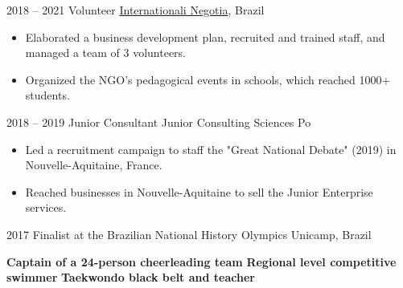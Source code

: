 \documentclass[9pt]{developercv} %
\begin{document}
\begin{entrylist}
\entry
		{2018 -- 2021}
		{Volunteer}
		{\href{https://www.internationali.org/sobre}{Internationali Negotia}, Brazil}
		{\vspace{-10pt}
        \begin{itemize}[noitemsep,topsep=0pt,parsep=0pt,partopsep=0pt, leftmargin=-1pt]
           \item Elaborated a business development plan, recruited and trained staff, and managed a team of 3 volunteers. 
           \item Organized the NGO's pedagogical events in schools, which reached 1000+ students.
        \end{itemize} 
        }
\entry
		{2018 -- 2019}
		{Junior Consultant}
		{Junior Consulting Sciences Po}
		{\vspace{-10pt}
        \begin{itemize}[noitemsep,topsep=0pt,parsep=0pt,partopsep=0pt, leftmargin=-1pt]
            \item Led a recruitment campaign to staff the "Great National Debate" (2019) in Nouvelle-Aquitaine, France. 
            \item Reached businesses in Nouvelle-Aquitaine to sell the Junior Enterprise services. 
        \end{itemize} 
        }
\entry
		{2017}
		{Finalist at the Brazilian National History Olympics}
		{Unicamp, Brazil}
            {}
\end{entrylist}
    \vspace{-10pt}
    \textbf{Captain of a 24-person cheerleading team}\slashsep
    \textbf{Regional level competitive swimmer}\slashsep
    \textbf{Taekwondo black belt and teacher} 
\end{document}
